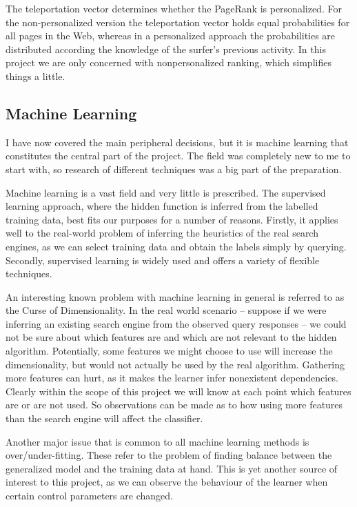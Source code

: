 \documentclass[12pt,notitlepage,twoside]{scrreprt}
\begin{document}
The teleportation vector determines whether the PageRank is personalized. For
the non-personalized version the teleportation vector holds equal probabilities
for all pages in the Web, whereas in a personalized approach the probabilities
are distributed according the knowledge of the surfer's previous activity. In
this project we are only concerned with nonpersonalized ranking, which
simplifies things a little.

\subsection{Machine Learning}

I have now covered the main peripheral decisions, but it is machine learning that
constitutes the central part of the project. The field was completely new to me
to start with, so research of different techniques was a big part of the
preparation.

Machine learning is a vast field and very little is prescribed.
The supervised learning approach, where the hidden function is
inferred from the labelled training data, best fits our purposes for a number
of reasons. Firstly, it applies well to the real-world problem of inferring the
heuristics of the real search engines, as we can select training data and
obtain the labels simply by querying. Secondly, supervised learning is widely
used and offers a variety of flexible techniques.

An interesting known problem with machine learning in general is referred to as
the Curse of Dimensionality. In the real world scenario -- suppose if we were
inferring an existing search engine from the observed query responses -- we
could not be sure about which features are and which are not relevant to the
hidden algorithm. Potentially, some features we might choose to use will
increase the dimensionality, but would not actually be used by the real
algorithm. Gathering more features can hurt, as it makes the learner infer
nonexistent dependencies. Clearly within the scope of this project we will know
at each point which features are or are not used. So observations can be made
as to how using more features than the search engine will affect the
classifier.

Another major issue that is common to all machine learning methods is
over/under-fitting. These refer to the problem of finding balance between the
generalized model and the training data at hand. This is yet another source of
interest to this project, as we can observe the behaviour of the learner when
certain control parameters are changed.
\end{document}
